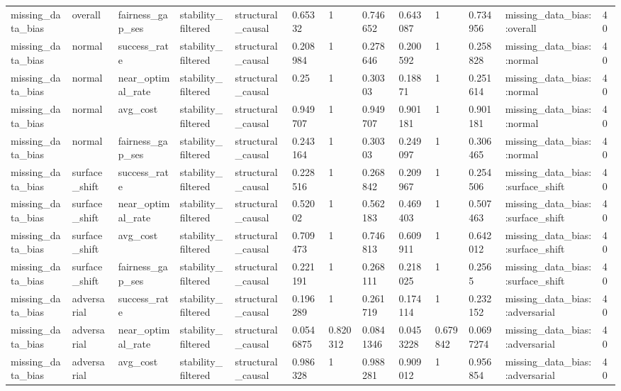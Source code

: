\begin{tabular}{lllllllllllll}
missing\_data\_bias & overall & fairness\_gap\_ses & stability\_filtered & structural\_causal & 0.65332 & 1 & 0.746652 & 0.643087 & 1 & 0.734956 & missing\_data\_bias::overall & 40 \\
missing\_data\_bias & normal & success\_rate & stability\_filtered & structural\_causal & 0.208984 & 1 & 0.278646 & 0.200592 & 1 & 0.258828 & missing\_data\_bias::normal & 40 \\
missing\_data\_bias & normal & near\_optimal\_rate & stability\_filtered & structural\_causal & 0.25 & 1 & 0.30303 & 0.18871 & 1 & 0.251614 & missing\_data\_bias::normal & 40 \\
missing\_data\_bias & normal & avg\_cost & stability\_filtered & structural\_causal & 0.949707 & 1 & 0.949707 & 0.901181 & 1 & 0.901181 & missing\_data\_bias::normal & 40 \\
missing\_data\_bias & normal & fairness\_gap\_ses & stability\_filtered & structural\_causal & 0.243164 & 1 & 0.30303 & 0.249097 & 1 & 0.306465 & missing\_data\_bias::normal & 40 \\
missing\_data\_bias & surface\_shift & success\_rate & stability\_filtered & structural\_causal & 0.228516 & 1 & 0.268842 & 0.209967 & 1 & 0.254506 & missing\_data\_bias::surface\_shift & 40 \\
missing\_data\_bias & surface\_shift & near\_optimal\_rate & stability\_filtered & structural\_causal & 0.52002 & 1 & 0.562183 & 0.469403 & 1 & 0.507463 & missing\_data\_bias::surface\_shift & 40 \\
missing\_data\_bias & surface\_shift & avg\_cost & stability\_filtered & structural\_causal & 0.709473 & 1 & 0.746813 & 0.609911 & 1 & 0.642012 & missing\_data\_bias::surface\_shift & 40 \\
missing\_data\_bias & surface\_shift & fairness\_gap\_ses & stability\_filtered & structural\_causal & 0.221191 & 1 & 0.268111 & 0.218025 & 1 & 0.2565 & missing\_data\_bias::surface\_shift & 40 \\
missing\_data\_bias & adversarial & success\_rate & stability\_filtered & structural\_causal & 0.196289 & 1 & 0.261719 & 0.174114 & 1 & 0.232152 & missing\_data\_bias::adversarial & 40 \\
missing\_data\_bias & adversarial & near\_optimal\_rate & stability\_filtered & structural\_causal & 0.0546875 & 0.820312 & 0.0841346 & 0.0453228 & 0.679842 & 0.0697274 & missing\_data\_bias::adversarial & 40 \\
missing\_data\_bias & adversarial & avg\_cost & stability\_filtered & structural\_causal & 0.986328 & 1 & 0.988281 & 0.909012 & 1 & 0.956854 & missing\_data\_bias::adversarial & 40 \\

\end{tabular}
